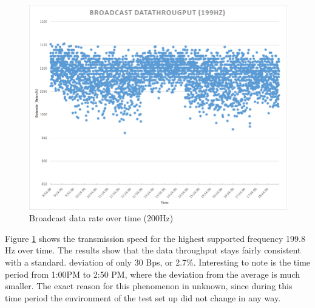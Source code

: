 \begin{description}
	\begin{figure}[H]
		\centering
		\includegraphics[scale=0.5]{./pics/exp1_long.png}
		\caption{Broadcast data rate over time (200Hz)}\label{fig:exp1long}
	\end{figure}
	Figure \ref{fig:exp1long} shows the transmission speed for the highest supported frequency 199.8 Hz over time. The results show that the data throughput stays fairly consistent with a standard. deviation of only 30 Bps, or 2.7\%. Interesting to note is the time period from 1:00PM to 2:50 PM, where the deviation from the average is much smaller. The exact reason for this phenomenon in unknown, since during this time period the environment of the test set up did not change in any way.
\end{description}
\newpage

